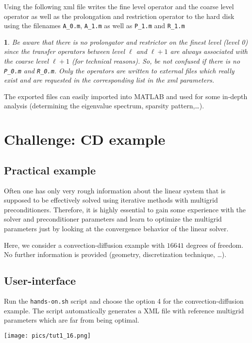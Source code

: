 \documentclass[10pt,fleqn]{book}
\newtheorem*{mycomment}{\ding{42}}
\begin{document}
Using the following xml file writes the fine level operator and the coarse level operator as well as the prolongation and restriction operator to the hard disk using the filenames \texttt{A\_0.m}, \texttt{A\_1.m} as well as \texttt{P\_1.m} and \texttt{R\_1.m}

\begin{mycomment}
Be aware that there is no prolongator and restrictor on the finest level (level 0) since the transfer operators between level $\ell$ and $\ell+1$ are always associated with the coarse level $\ell +1$ (for technical reasons). So, be not confused if there is no \texttt{P\_0.m} and \texttt{R\_0.m}. Only the operators are written to external files which really exist and are requested in the corresponding list in the xml parameters.
\end{mycomment}

The exported files can easily imported into MATLAB and used for some in-depth analysis (determining the eigenvalue spectrum, sparsity pattern,\ldots).

\chapter{Challenge: CD example}

\section{Practical example}

Often one has only very rough information about the linear system that is supposed to be effectively solved using iterative methods with multigrid preconditioners. Therefore, it is highly essential to gain some experience with the solver and preconditioner parameters and learn to optimize the multigrid parameters just by looking at the convergence behavior of the linear solver.

Here, we consider a convection-diffusion example with $16641$ degrees of freedom. No further information is provided (geometry, discretization technique, \ldots).

\section{User-interface}
Run the \verb|hands-on.sh| script and choose the option 4 for the convection-diffusion example. The script automatically generates a XML file with reference multigrid parameters which are far from being optimal.
\begin{center}\texttt{[image: pics/tut1\_16.png]} \end{center}
\end{document}
